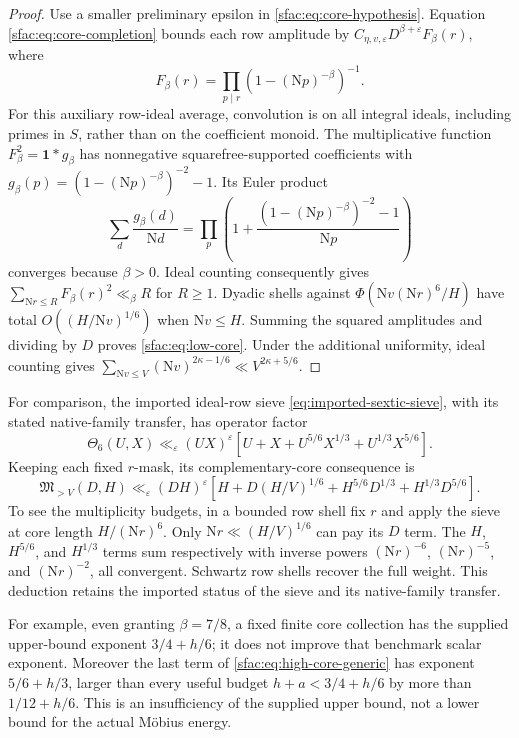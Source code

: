 \documentclass[11pt]{article}
\numberwithin{equation}{section}
\theoremstyle{definition}
\theoremstyle{remark}
\newcommand{\N}{\mathrm N}
\begin{document}
\begin{proof}
Use a smaller preliminary epsilon in \eqref{sfac:eq:core-hypothesis}.
Equation \eqref{sfac:eq:core-completion} bounds each row amplitude by
$C_{\eta,v,\varepsilon}D^{\beta+\varepsilon}F_\beta(r)$, where
\[
 F_\beta(r)=\prod_{p\mid r}(1-(\N p)^{-\beta})^{-1}.
\]
For this auxiliary row-ideal average, convolution is on all integral
ideals, including primes in $S$, rather than on the coefficient monoid.
The multiplicative function $F_\beta^2=\mathbf1*g_\beta$ has
nonnegative squarefree-supported coefficients with
$g_\beta(p)=(1-(\N p)^{-\beta})^{-2}-1$.  Its Euler product
\[
 \sum_d\frac{g_\beta(d)}{\N d}
   =\prod_p\left(1+
    \frac{(1-(\N p)^{-\beta})^{-2}-1}{\N p}\right)
\]
converges because $\beta>0$.  Ideal counting consequently gives
$\sum_{\N r\le R}F_\beta(r)^2\ll_\beta R$ for $R\ge1$.
Dyadic shells against $\Phi(\N v(\N r)^6/H)$ have total
$O((H/\N v)^{1/6})$ when $\N v\le H$.  Summing the squared amplitudes
and dividing by $D$ proves \eqref{sfac:eq:low-core}.
Under the additional uniformity, ideal counting gives
$\sum_{\N v\le V}(\N v)^{2\kappa-1/6}\ll V^{2\kappa+5/6}$.
\end{proof}

For comparison, the imported ideal-row sieve
\eqref{eq:imported-sextic-sieve}, with its stated native-family transfer,
has operator factor
\[
 \Theta_6(U,X)\ll_\varepsilon(UX)^\varepsilon
   [U+X+U^{5/6}X^{1/3}+U^{1/3}X^{5/6}].
\]
Keeping each fixed $r$-mask, its complementary-core consequence is
\begin{equation}
 \mathfrak M_{>V}(D,H)\ll_\varepsilon(DH)^\varepsilon
 \left[H+D(H/V)^{1/6}
          +H^{5/6}D^{1/3}+H^{1/3}D^{5/6}\right].
 \label{sfac:eq:high-core-generic}
\end{equation}
To see the multiplicity budgets, in a bounded row shell fix $r$ and
apply the sieve at core length $H/(\N r)^6$.  Only
$\N r\ll(H/V)^{1/6}$ can pay its $D$ term.  The $H$, $H^{5/6}$,
and $H^{1/3}$ terms sum respectively with inverse powers
$(\N r)^{-6}$, $(\N r)^{-5}$, and $(\N r)^{-2}$, all convergent.
Schwartz row shells recover the full weight.  This deduction retains
the imported status of the sieve and its native-family transfer.

For example, even granting $\beta=7/8$, a fixed finite core collection
has the supplied upper-bound exponent $3/4+h/6$; it does not improve
that benchmark scalar exponent.  Moreover the last term of
\eqref{sfac:eq:high-core-generic} has exponent $5/6+h/3$, larger
than every useful budget $h+a<3/4+h/6$ by more than
$1/12+h/6$.  This is an insufficiency of the supplied upper bound,
not a lower bound for the actual Möbius energy.
\end{document}
